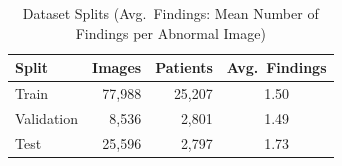 \begin{table}[t]
\caption{Dataset Splits (Avg.\ Findings: Mean Number of Findings per Abnormal Image)}
\label{tab:splits}
\centering
\begin{tabular}{lrrc}
\toprule
Split & Images & Patients & Avg.\ Findings \\
\midrule
Train & 77,988 & 25,207 & 1.50 \\
Validation & 8,536 & 2,801 & 1.49 \\
Test & 25,596 & 2,797 & 1.73 \\
\bottomrule
\end{tabular}
\end{table}
